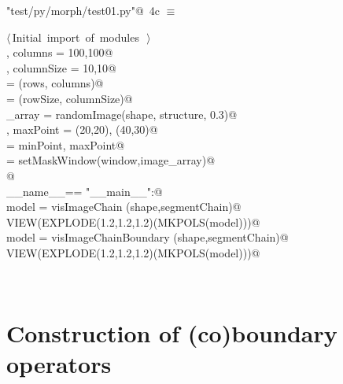 \documentclass[11pt,oneside]{article}	%
\begin{document}
\begin{flushleft} \small
\begin{minipage}{\linewidth} \label{scrap8}
\protect{}\verb@"test/py/morph/test01.py"@\nobreak\ {\footnotesize 4c }$\equiv$
\vspace{-1ex}
\begin{list}{}{} \item
\mbox{}\verb@@\hbox{$\langle\,$Initial import of modules\nobreak\ {\footnotesize {}}$\,\rangle$}\verb@@\\
\mbox{}\verb@rows, columns = 100,100@\\
\mbox{}\verb@rowSize, columnSize = 10,10@\\
\mbox{}\verb@shape = (rows, columns)@\\
\mbox{}\verb@structure = (rowSize, columnSize)@\\
\mbox{}\verb@image_array = randomImage(shape, structure, 0.3)@\\
\mbox{}\verb@minPoint, maxPoint = (20,20), (40,30)@\\
\mbox{}\verb@window = minPoint, maxPoint@\\
\mbox{}\verb@segmentChain = setMaskWindow(window,image_array)@\\
\mbox{}\verb@   @\\
\mbox{}\verb@if __name__== "__main__":@\\
\mbox{}\verb@   model = visImageChain (shape,segmentChain)@\\
\mbox{}\verb@   VIEW(EXPLODE(1.2,1.2,1.2)(MKPOLS(model)))@\\
\mbox{}\verb@   model = visImageChainBoundary (shape,segmentChain)@\\
\mbox{}\verb@   VIEW(EXPLODE(1.2,1.2,1.2)(MKPOLS(model)))@\\
\mbox{}\verb@@{\NWsep}
\end{list}
\vspace{-2ex}
\end{minipage}\\[4ex]
\end{flushleft}

\section{Construction of (co)boundary operators}
\end{document}
